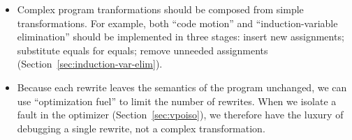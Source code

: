 \documentclass[blockstyle,preprint,natbib,nocopyrightspace]{sigplanconf}
\newcommand\secref[1]{Section~\ref{sec:#1}}
\begin{document}
\begin{itemize}
\item
Complex program tranformations should be composed from simple
transformations. 
For example, both ``code motion'' and ``induction-variable
elimination'' should be implemented in three stages: insert new assignments;
substitute equals for equals; remove unneeded assignments
(\secref{induction-var-elim}). 

\item 
Because each rewrite leaves the semantics
of the program unchanged, 
we can use 
``optimization fuel'' to limit the number of rewrites.
 When we isolate a fault in the optimizer
(\secref{vpoiso}), we therefore have the luxury of debugging a single
 rewrite, not a complex transformation.
\end{itemize}
\end{document}
